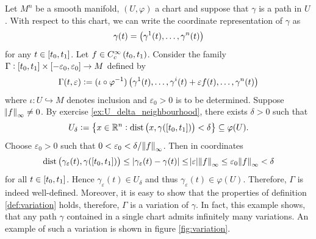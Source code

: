 \begin{example}
	\label{ex:perturbation_along_single_direction}
	Let $M^n$ be a smooth manifold, $(U,\varphi)$ a chart and suppose that $\gamma$ is a path in $U$. With respect to this chart, we can write the coordinate representation of $\gamma$ as
	\begin{equation*}
		\gamma(t) = \del[1]{\gamma^1(t),\dots,\gamma^n(t)}
	\end{equation*}
	\noindent for any $t \in \intcc[0]{t_0,t_1}$. Let $f \in C^\infty_c\intoo[0]{t_0,t_1}$. Consider the family $\Gamma : \intcc[0]{t_0,t_1} \times \intcc[0]{-\varepsilon_0,\varepsilon_0} \to M$ defined by
	\begin{equation*}
		\Gamma(t,\varepsilon) := (\iota \circ \varphi^{-1})\del[1]{\gamma^1(t),\dots,\gamma^i(t) + \varepsilon f(t),\dots,\gamma^n(t)}
	\end{equation*}
	\noindent where $\iota : U \hookrightarrow M$ denotes inclusion and $\varepsilon_0 > 0$ is to be determined. Suppose $\norm{f}_\infty \neq 0$. By exercise \ref{ex:U_delta_neighbourhood}, there exists $\delta > 0$ such that
	\begin{equation*}
		U_\delta := \cbr[1]{x \in \mathbb{R}^n : \dist\del[1]{x,\gamma(\intcc[0]{t_0,t_1})} < \delta} \subseteq \varphi(U).
	\end{equation*}
	Choose $\varepsilon_0 > 0$ such that $0 < \varepsilon_0 < \delta/\norm{f}_\infty$. Then in coordinates
	\begin{equation*}
		\dist\del[1]{\gamma_\varepsilon(t), \gamma(\intcc[0]{t_0,t_1})} \leq \abs[0]{\gamma_\varepsilon(t) - \gamma(t)} \leq \abs{\varepsilon} \norm{f}_\infty \leq \varepsilon_0 \norm{f}_\infty < \delta 
	\end{equation*}
	\noindent for all $t \in \intcc[0]{t_0,t_1}$. Hence $\gamma_\varepsilon(t) \in U_\delta$ and thus $\gamma_\varepsilon(t) \in \varphi(U)$. Therefore, $\Gamma$ is indeed well-defined. Moreover, it is easy to show that the properties of definition \ref{def:variation} holds, therefore, $\Gamma$ is a variation of $\gamma$. In fact, this example shows, that any path $\gamma$ contained in a single chart admits infinitely many variations. An example of such a variation is shown in figure \ref{fig:variation}.


\end{example}

